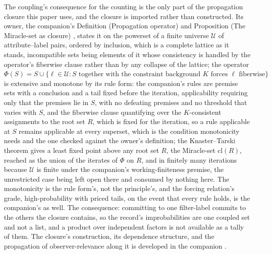 \documentclass[11pt]{article}
\theoremstyle{definition}
\begin{document}
\label{def:propagation-operator}The coupling's consequence for the counting is the only part of the propagation closure this paper uses, and the closure is imported rather than constructed. Its owner, the companion's Definition (Propagation operator) and Proposition (The Miracle-set as closure) \cite{Nexus}, states it on the powerset of a finite universe $\mathcal{U}$ of attribute--label pairs, ordered by inclusion, which is a complete lattice as it stands, incompatible sets being elements of it whose consistency is handled by the operator's fiberwise clause rather than by any collapse of the lattice; the operator $\Phi(S) = S \cup \{\ell \in \mathcal{U} : S \text{ together with the constraint background } K \text{ forces } \ell \text{ fiberwise}\}$ is extensive and monotone by its rule form: the companion's rules are premise sets with a conclusion and a tail fixed before the iteration, applicability requiring only that the premises lie in $S$, with no defeating premises and no threshold that varies with $S$, and the fiberwise clause quantifying over the $K$-consistent assignments to the root set $R$, which is fixed for the iteration, so a rule applicable at $S$ remains applicable at every superset, which is the condition monotonicity needs and the one checked against the owner's definition; the Knaster--Tarski theorem gives a least fixed point above any root set $R$, the Miracle-set $\mathrm{cl}(R)$, reached as the union of the iterates of $\Phi$ on $R$, and in finitely many iterations because $\mathcal{U}$ is finite under the companion's working-finiteness premise, the unrestricted case being left open there and consumed by nothing here. The monotonicity is the rule form's, not the principle's, and the forcing relation's grade, high-probability with priced tails, on the event that every rule holds, is the companion's as well. The consequence: committing to one filter-label commits to the others the closure contains, so the record's improbabilities are one coupled set and not a list, and a product over independent factors is not available as a tally of them. The closure's construction, its dependence structure, and the propagation of observer-relevance along it is developed in the companion \cite{Nexus}.
\end{document}
